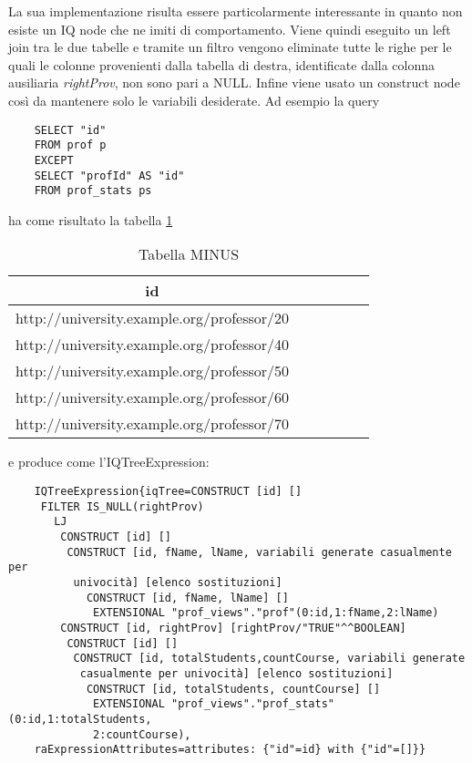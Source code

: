 La sua implementazione risulta essere particolarmente interessante in quanto non esiste un IQ node che ne imiti di comportamento. Viene quindi eseguito un left join tra le due
tabelle e tramite un filtro vengono eliminate tutte le righe per le quali le colonne provenienti dalla tabella di destra, identificate dalla colonna ausiliaria \textit{rightProv}, 
non sono pari a NULL. Infine viene usato un construct node così da mantenere solo le variabili desiderate. Ad esempio la query
\begin{verbatim}
    SELECT "id"
    FROM prof p
    EXCEPT
    SELECT "profId" AS "id"
    FROM prof_stats ps 
\end{verbatim}
ha come risultato la tabella \ref{tab:minus}
\begin{table}[h]
    \centering
    \caption{Tabella MINUS}
    \label{tab:minus}
    \begin{tabular}{ | c | c | c | c | c | c |}
        \hline
        id                                         \\ \hline
        http://university.example.org/professor/20 \\ \hline
        http://university.example.org/professor/40 \\ \hline
        http://university.example.org/professor/50 \\ \hline
        http://university.example.org/professor/60 \\ \hline
        http://university.example.org/professor/70 \\ 
        \hline
    \end{tabular}
\end{table}

\noindent
e produce come l'IQTreeExpression: 
\begin{verbatim}
    IQTreeExpression{iqTree=CONSTRUCT [id] []
     FILTER IS_NULL(rightProv)
       LJ
        CONSTRUCT [id] []
         CONSTRUCT [id, fName, lName, variabili generate casualmente per
          univocità] [elenco sostituzioni]
            CONSTRUCT [id, fName, lName] []
             EXTENSIONAL "prof_views"."prof"(0:id,1:fName,2:lName)
        CONSTRUCT [id, rightProv] [rightProv/"TRUE"^^BOOLEAN]
         CONSTRUCT [id] []
          CONSTRUCT [id, totalStudents,countCourse, variabili generate 
           casualmente per univocità] [elenco sostituzioni]
            CONSTRUCT [id, totalStudents, countCourse] []
             EXTENSIONAL "prof_views"."prof_stats"(0:id,1:totalStudents,
             2:countCourse),
    raExpressionAttributes=attributes: {"id"=id} with {"id"=[]}}
\end{verbatim}

